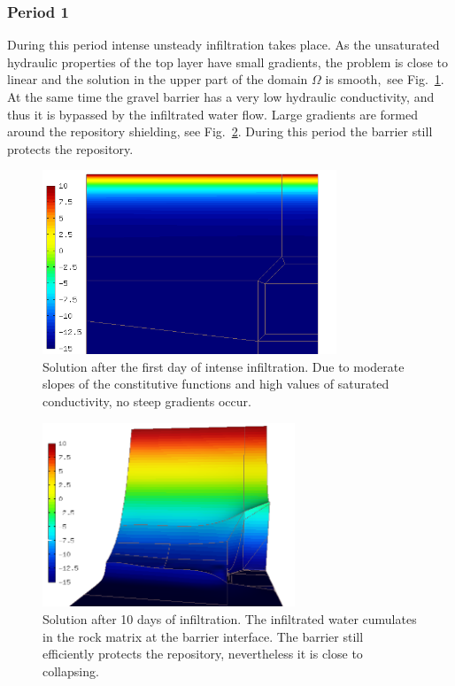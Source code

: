 \documentclass[final,3p,times,twocolumn]{elsarticle}
\begin{document}
\subsubsection{Period 1}

During this period intense unsteady infiltration takes place. As the unsaturated hydraulic 
properties of the top layer have small gradients, the problem is close to linear 
and the solution in the upper part of the domain $\Omega$ is smooth,~see 
Fig.~\ref{fig:solution1.1}. At the same time the gravel barrier has a very low hydraulic 
conductivity, and thus it is bypassed by the infiltrated water flow. Large gradients 
are formed around the repository shielding, see Fig.~\ref{fig:solution1.2}. During this 
period the barrier still protects the repository.\\

\begin{figure}[!htb]
\begin{center}
\includegraphics[height=5.5cm]{solution3-init.png}
\end{center}
\vspace{-4mm}
\caption{Solution after the first day of intense infiltration. Due to moderate slopes of the constitutive functions and high values of saturated conductivity, no steep gradients occur.}
\label{fig:solution1.1}
\end{figure}

\begin{figure}[!htb]
\begin{center}
\includegraphics[height=5.5cm]{solution3_steep.png}
\end{center}
\vspace{-4mm}
\caption{Solution after 10 days of infiltration. The infiltrated water cumulates in the rock matrix at the barrier interface. The barrier still efficiently protects the repository, nevertheless it is close to collapsing.}
\label{fig:solution1.2}
\vspace{-4.5mm}
\end{figure}
\end{document}
